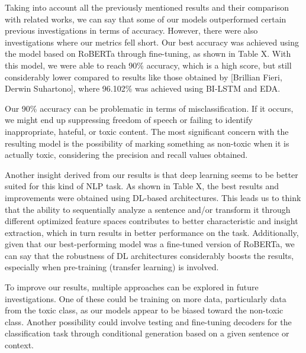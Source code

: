 Taking into account all the previously mentioned results and their comparison with related works, we can say that some of our models outperformed certain previous investigations in terms of accuracy. However, there were also investigations where our metrics fell short. Our best accuracy was achieved using the model based on RoBERTa through fine-tuning, as shown in Table X. With this model, we were able to reach 90\% accuracy, which is a high score, but still considerably lower compared to results like those obtained by [Brillian Fieri, Derwin Suhartono], where 96.102\% was achieved using BI-LSTM and EDA.

Our 90\% accuracy can be problematic in terms of misclassification. If it occurs, we might end up suppressing freedom of speech or failing to identify inappropriate, hateful, or toxic content. The most significant concern with the resulting model is the possibility of marking something as non-toxic when it is actually toxic, considering the precision and recall values obtained.

Another insight derived from our results is that deep learning seems to be better suited for this kind of NLP task. As shown in Table X, the best results and improvements were obtained using DL-based architectures. This leads us to think that the ability to sequentially analyze a sentence and/or transform it through different optimized feature spaces contributes to better characteristic and insight extraction, which in turn results in better performance on the task. Additionally, given that our best-performing model was a fine-tuned version of RoBERTa, we can say that the robustness of DL architectures considerably boosts the results, especially when pre-training (transfer learning) is involved.

To improve our results, multiple approaches can be explored in future investigations. One of these could be training on more data, particularly data from the toxic class, as our models appear to be biased toward the non-toxic class. Another possibility could involve testing and fine-tuning decoders for the classification task through conditional generation based on a given sentence or context.